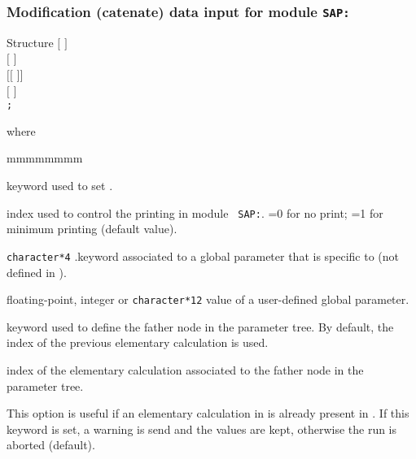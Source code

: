 \subsubsection{Modification (catenate) data input for module {\tt SAP:}}\label{sect:descsap3}

\vskip -0.5cm

\begin{DataStructure}{Structure }
$[$   $]$ \\
$[$   $]$ \\
$[[$   $]]$ \\
$[$  $]$ \\
{\tt ;}
\end{DataStructure}

\noindent where
\begin{ListeDeDescription}{mmmmmmmm}

\item[\moc{EDIT}] keyword used to set .

\item[\dusa{iprint}] index used to control the printing in module {\tt
SAP:}. =0 for no print; =1 for minimum printing (default value).

\item[\dusa{parkey}] {\tt character*4} .keyword associated to a
global parameter that is specific to  (not defined in ).

\item[\dusa{value}] floating-point, integer or {\tt character*12} value of a user-defined
global parameter.

\item[\moc{ORIG}] keyword used to define the father node in the parameter tree. By
default, the index of the previous elementary calculation is used.

\item[\dusa{orig}] index of the elementary calculation associated to the father node in the
parameter tree.

\item[\moc{WARNING-ONLY}] This option is useful if an elementary calculation in  
is already present in . If this keyword is set, a warning is send and the  values
are kept, otherwise the run is aborted (default).

\end{ListeDeDescription}

\clearpage
